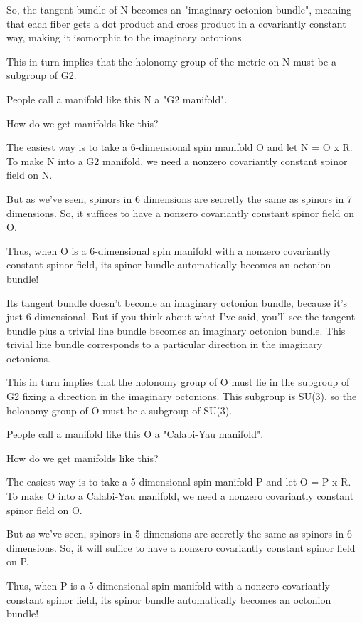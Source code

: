 So, the tangent bundle of N becomes an "imaginary octonion bundle", 
meaning that each fiber gets a dot product and cross product in a 
covariantly constant way, making it isomorphic to the imaginary octonions.

This in turn implies that the holonomy group of the metric on N must 
be a subgroup of G2.  

People call a manifold like this N a "G2 manifold".  

How do we get manifolds like this?

The easiest way is to take a 6-dimensional spin manifold O and let 
N = O x R.   To make N into a G2 manifold, we need a nonzero covariantly 
constant spinor field on N.  

But as we've seen, spinors in 6 dimensions are secretly the same 
as spinors in 7 dimensions.  So, it suffices to have a nonzero 
covariantly constant spinor field on O.  

Thus, when O is a 6-dimensional spin manifold with a nonzero 
covariantly constant spinor field, its spinor bundle automatically
becomes an octonion bundle!

Its tangent bundle doesn't become an imaginary octonion bundle,
because it's just 6-dimensional.  But if you think about what I've
said, you'll see the tangent bundle plus a trivial line bundle 
becomes an imaginary octonion bundle.  This trivial line bundle
corresponds to a particular direction in the imaginary octonions.

This in turn implies that the holonomy group of O must lie in the 
subgroup of G2 fixing a direction in the imaginary octonions.  
This subgroup is SU(3), so the holonomy group of O must be a 
subgroup of SU(3).  

People call a manifold like this O a "Calabi-Yau manifold".

How do we get manifolds like this?

The easiest way is to take a 5-dimensional spin manifold P and let 
O = P x R.   To make O into a Calabi-Yau manifold, we need a nonzero 
covariantly constant spinor field on O.

But as we've seen, spinors in 5 dimensions are secretly the same as
spinors in 6 dimensions.   So, it will suffice to have a nonzero
covariantly constant spinor field on P.

Thus, when P is a 5-dimensional spin manifold with a nonzero
covariantly constant spinor field, its spinor bundle automatically
becomes an octonion bundle!

